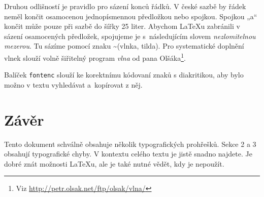 \documentclass[twocolumn,a4paper,10pt]{article}
\begin{document}
Druhou odlišností je pravidlo pro sázení konců řádků. V české sazbě by řádek neměl končit osamocenou jednopísmennou předložkou nebo spojkou. Spojkou „a“ končit může pouze při sazbě do šířky 25 liter. Abychom \LaTeX u zabránili v sázení osamocených předložek, spojujeme je s~následujícím slovem \textit{nezlomitelnou mezerou}. Tu sázíme pomocí znaku \textasciitilde (vlnka, tilda). Pro systematické doplnění vlnek slouží volně šiřitelný program \textit{vlna} od pana Olšáka\footnote{Viz \url{http://petr.olsak.net/ftp/olsak/vlna/}}.

Balíček \texttt{fontenc} slouží ke korektnímu kódovaní znaků s diakritikou, aby bylo možno v textu vyhledávat a~kopírovat z něj.

\section {Závěr}

\noindent Tento dokument schválně obsahuje několik typografických prohřešků. Sekce 2 a 3 obsahují typografické chyby. V kontextu celého textu je jistě snadno najdete. Je dobré znát možnosti \LaTeX u, ale je také nutné vědět, kdy je nepoužít.
\end{document}
